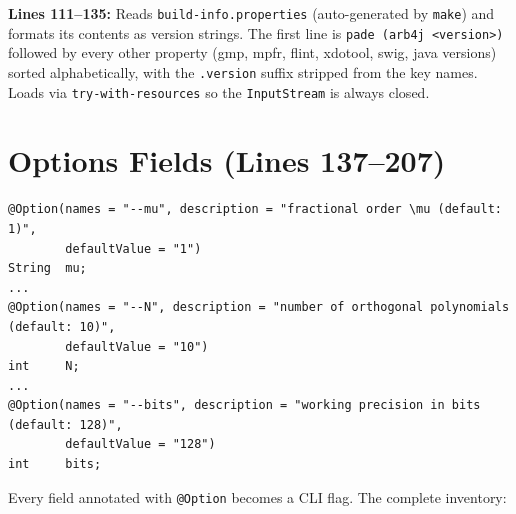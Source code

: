 \documentclass[a4paper,11pt]{article}
\begin{document}
\textbf{Lines 111--135:} Reads \texttt{build-info.properties} (auto-generated by
\texttt{make}) and formats its contents as version strings. The first line is
\texttt{pade (arb4j <version>)} followed by every other property (gmp, mpfr,
flint, xdotool, swig, java versions) sorted alphabetically, with the
\texttt{.version} suffix stripped from the key names. Loads via
\texttt{try-with-resources} so the \texttt{InputStream} is always closed.

\section{Options Fields (Lines 137--207)}

\begin{lstlisting}[firstnumber=137]
@Option(names = "--mu", description = "fractional order \mu (default: 1)",
        defaultValue = "1")
String  mu;
...
@Option(names = "--N", description = "number of orthogonal polynomials (default: 10)",
        defaultValue = "10")
int     N;
...
@Option(names = "--bits", description = "working precision in bits (default: 128)",
        defaultValue = "128")
int     bits;
\end{lstlisting}

Every field annotated with \texttt{@Option} becomes a CLI flag. The complete
inventory:
\end{document}

